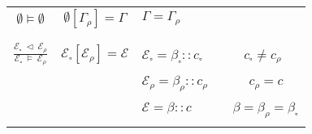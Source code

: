 \documentclass{entcs}
\renewcommand{\~}[0]{\texttildelow}
\begin{document}
\begin{defn}
\begin{center}
{\begin{tabular}{ c | | c | l }
	$\emptyset \models \emptyset $ & 
    $ \emptyset[\Gamma_\rho] = \Gamma $ & 
    $\Gamma = \Gamma_\rho $ \\

    & & \\[0.02cm]
    \hline
    & & \\[0.02cm]

	$ \frac{\mathcal{E}_{\square}~\lhd~\mathcal{E}_\rho}{\mathcal{E}_{\square}~\models~\mathcal{E}_\rho} $ & 
    $ \mathcal{E}_{\square}[\mathcal{E}_\rho] = \mathcal{E} $ & 
    $ \mathcal{E}_{\square} = \beta_{\square}::c_{\square} $ ~~~~~ $ c_{\square} \neq c_\rho $ \\

    &  & $ \mathcal{E}_\rho = \beta_\rho::c_\rho $ ~~~~~ $ c_\rho = c $\\

    &  & $ \mathcal{E} = \beta::c $ ~~~~~ $ \beta = \beta_\rho = \beta_{\square} $\\

    & & \\[0.02cm]
    \hline
    \end{tabular}}
    \end{center}

\end{defn}







\end{document}
